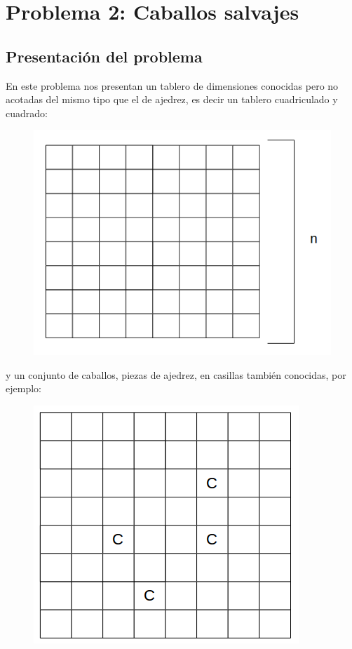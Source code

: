 \section{Problema 2: Caballos salvajes}

\subsection{Presentación del problema}
En este problema nos presentan un tablero de dimensiones conocidas pero no acotadas
del mismo tipo que el de ajedrez, es decir un tablero cuadriculado y cuadrado:\\
\begin{figure}[H]
	\begin{minipage}[t]{\linewidth}
		\centering
		\includegraphics[scale=0.5]{show_dimension.png}
		\label{fig:p2_complejidad_varia_k}
	\end{minipage}
\end{figure}
y un conjunto de caballos, piezas de ajedrez, en casillas también conocidas, por ejemplo:\\
\begin{figure}[H]
	\begin{minipage}[t]{\linewidth}
		\centering
		\includegraphics[scale=0.5]{show_horses.png}
		\label{fig:p2_complejidad_varia_k}
	\end{minipage}
\end{figure}
